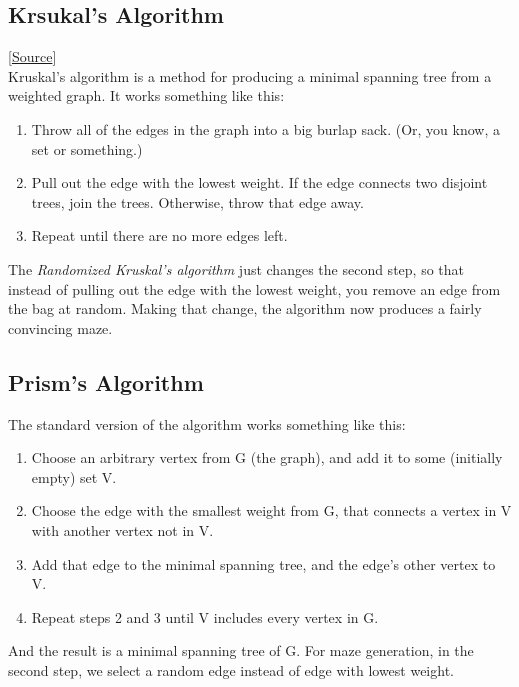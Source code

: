 \documentclass{article}
\begin{document}
\subsection{Krsukal's Algorithm}
[\href{https://weblog.jamisbuck.org/2011/1/3/maze-generation-kruskal-s-algorithm}{Source}]\\
Kruskal's algorithm is a method for producing a minimal spanning tree from a weighted graph. It works something like this:

\begin{enumerate}
    \item Throw all of the edges in the graph into a big burlap sack. (Or, you know, a set or something.)
    \item Pull out the edge with the lowest weight. If the edge connects two disjoint trees, join the trees. Otherwise, throw that edge away.
    \item Repeat until there are no more edges left.
\end{enumerate}

The {\it Randomized Kruskal's algorithm} just changes the second step, so that instead of pulling out the edge with the lowest weight, you remove an edge from the bag at random. Making that change, the algorithm now produces a fairly convincing maze.

\subsection{Prism's Algorithm}
The standard version of the algorithm works something like this:
\begin{enumerate}
    \item Choose an arbitrary vertex from G (the graph), and add it to some (initially empty) set V.
    \item Choose the edge with the smallest weight from G, that connects a vertex in V with another vertex not in V.
    \item Add that edge to the minimal spanning tree, and the edge's other vertex to V.
    \item Repeat steps 2 and 3 until V includes every vertex in G.
\end{enumerate}

And the result is a minimal spanning tree of G. For maze generation, in the second step, we select a random edge instead of edge with lowest weight.
\end{document}
